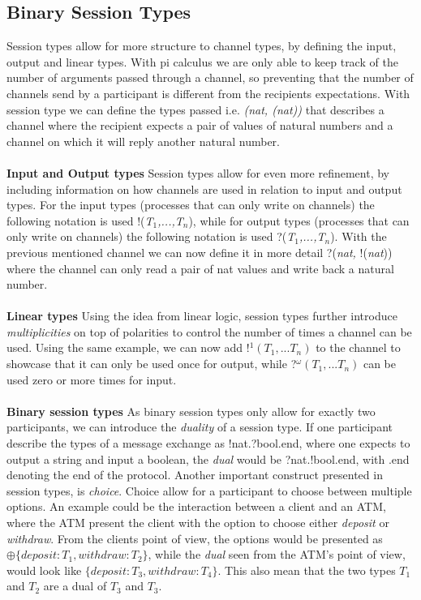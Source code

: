 \subsection{Binary Session Types}
Session types allow for more structure to channel types, by defining the input, output and linear types. With pi calculus we are only able to keep track of the number of arguments passed through a channel, so preventing that the number of channels send by a participant is different from the recipients expectations. With session type we can define the types passed i.e. \textit{(nat, (nat))} that describes a channel where the recipient expects a pair of values of natural numbers and a channel on which it will reply another natural number. \\ \\
\textbf{Input and Output types} \qquad
Session types allow for even more refinement, by including information on how channels are used in relation to input and output types. For the input types (processes that can only write on channels) the following notation is used !(\textit{T$_1$,...,T$_n$}), while for output types (processes that can only write on channels) the following notation is used ?(\textit{T$_1$,...,T$_n$}). With the previous mentioned channel we can now define it in more detail ?(\textit{nat, }!(\textit{nat})) where the channel can only read a pair of nat values and write back a natural number. \\ \\
\textbf{Linear types}  \qquad 
Using the idea from linear logic, session types further introduce \textit{multiplicities} on top of polarities to control the number of times a channel can be used. Using the same example, we can now add !$^1(T_1,...T_n)$ to the channel to showcase that it can only be used once for output, while ?$^\omega (T_1,...T_n)$ can be used zero or more times for input. \\ \\
\textbf{Binary session types} \qquad 
As binary session types only allow for exactly two participants, we can introduce the \textit{duality} of a session type. If one participant describe the types of a message exchange as !nat.?bool.end, where one expects to output a string and input a boolean, the \textit{dual} would be ?nat.!bool.end, with .end denoting the end of the protocol. Another important construct presented in session types, is \textit{choice}. Choice allow for a participant to choose between multiple options. An example could be the interaction between a client and an ATM, where the ATM present the client with the option to choose either \textit{deposit} or \textit{withdraw}. From the clients point of view, the options would be presented as $\oplus \{ deposit : T_1, withdraw : T_2\}$, while the \textit{dual} seen from the ATM's point of view, would look like $\{deposit : T_3, withdraw : T_4\}$. This also mean that the two types $T_1$ and $T_2$ are a dual of $T_3$ and $T_3$.


